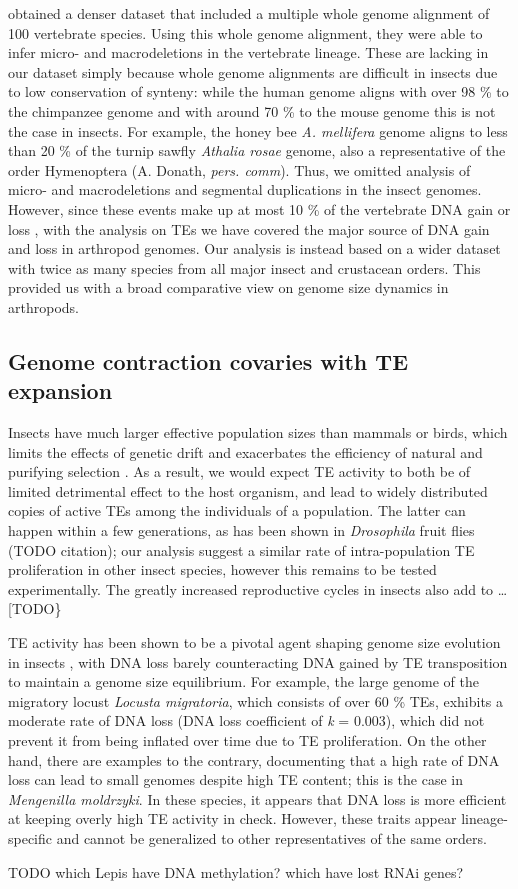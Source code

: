 \citet{Kapusta2017a} obtained a denser dataset that included a
multiple whole genome alignment of 100 vertebrate species. Using this
whole genome alignment, they were able to infer micro- and
macrodeletions in the vertebrate lineage. These are lacking in our
dataset simply because whole genome alignments are difficult in insects
due to low conservation of synteny: while the human genome aligns with
over 98 \% to the chimpanzee genome and with around 70 \% to the mouse
genome \cite{Mural2002} this is not the case in insects. For example,
the honey bee \emph{A. mellifera} genome aligns to less than 20 \% of
the turnip sawfly \emph{Athalia rosae} genome, also a representative of
the order Hymenoptera (A. Donath, \emph{pers. comm}). Thus, we omitted
analysis of micro- and macrodeletions and segmental duplications in the
insect genomes. However, since these events make up at most 10 \% of the
vertebrate DNA gain or loss \citep{Kapusta2017a}, with the analysis on
TEs we have covered the major source of DNA gain and loss in arthropod
genomes. Our analysis is instead based on a wider dataset with twice as
many species from all major insect and crustacean orders. This provided
us with a broad comparative view on genome size dynamics in arthropods.

\subsection{Genome contraction covaries with TE
expansion}\label{genome-contraction-covaries-with-te-expansion}

Insects have much larger effective population sizes than mammals or
birds, which limits the effects of genetic drift and exacerbates the
efficiency of natural and purifying selection \citep{Szitenberg2016}. As a
result, we would expect TE activity to both be of limited detrimental
effect to the host organism, and lead to widely distributed copies of
active TEs among the individuals of a population. The latter can happen
within a few generations, as has been shown in \emph{Drosophila} fruit
flies (TODO citation); our analysis suggest a similar rate of
intra-population TE proliferation in other insect species, however this
remains to be tested experimentally. The greatly increased reproductive
cycles in insects also add to \ldots{} {[}TODO\}

TE activity has been shown to be a pivotal agent shaping genome size
evolution in insects \citep{Maumus2015}, with DNA loss barely
counteracting DNA gained by TE transposition to maintain a genome size
equilibrium. For example, the large genome of the migratory locust
\emph{Locusta migratoria}, which consists of over 60 \% TEs, exhibits a
moderate rate of DNA loss (DNA loss coefficient of \emph{k} = 0.003),
which did not prevent it from being inflated over time due to TE
proliferation. On the other hand, there are examples to the contrary,
documenting that a high rate of DNA loss can lead to small genomes
despite high TE content; this is the case in \emph{Mengenilla
moldrzyki}. In these species, it appears that DNA loss is more efficient
at keeping overly high TE activity in check. However, these traits
appear lineage-specific and cannot be generalized to other
representatives of the same orders.

TODO which Lepis have DNA methylation? which have lost RNAi genes?
